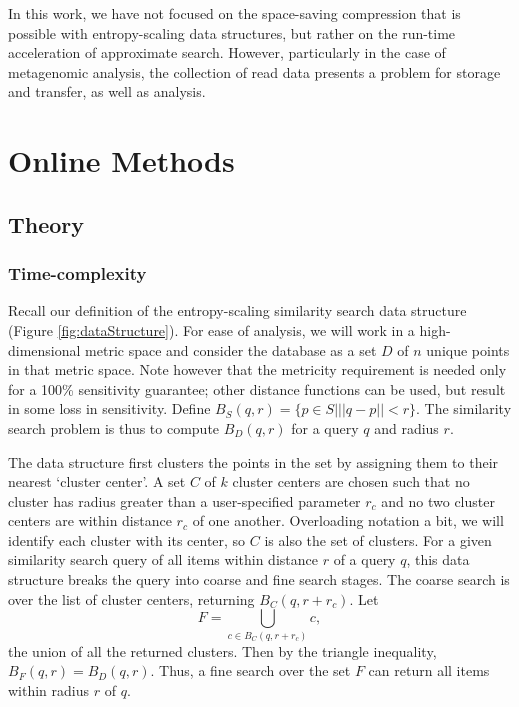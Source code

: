 \documentclass[review,preprint,12pt]{elsarticle}
\theoremstyle{definition}
\theoremstyle{remark}
\numberwithin{equation}{section}
\begin{document}
In this work, we have not focused on the space-saving compression that is
possible with entropy-scaling data structures, but rather on the run-time
acceleration of approximate search.
However, particularly in the case of metagenomic analysis, the collection of 
read data presents a problem for storage and transfer, as well as analysis.



\section{Online Methods}

\subsection{Theory}
\subsubsection{Time-complexity}
Recall our definition of the entropy-scaling similarity search data structure (Figure \ref{fig:dataStructure}).
For ease of analysis, we will work in a high-dimensional metric space and consider the database as a set $D$ of $n$ unique points in that metric space.
Note however that the metricity requirement is needed only for a 100\% sensitivity guarantee; other distance functions can be used, but result in some loss in sensitivity.
Define $B_S(q,r) = \{ p \in S | ||q-p||<r \}$. The similarity search problem is thus to compute $B_D(q,r)$ for a query $q$ and radius $r$.

The data structure first clusters the points in the set by assigning them to their nearest `cluster center'.
A set $C$ of $k$ cluster centers are chosen such that no cluster has radius greater than a user-specified parameter $r_c$ and no two cluster centers are within distance $r_c$ of one another.
Overloading notation a bit, we will identify each cluster with its center, so $C$ is also the set of clusters.
For a given similarity search query of all items within distance $r$ of a query $q$, this data structure breaks the query into coarse and fine search stages.
The coarse search is over the list of cluster centers, returning $B_C(q,r + r_c)$.
Let \[\displaystyle F = \bigcup_{c \in B_C(q,r+r_c)} c , \] the union of all the returned clusters.
Then by the triangle inequality, $B_F(q,r) = B_D(q,r)$.
Thus, a fine search over the set $F$ can return all items within radius $r$ of $q$.
\end{document}
